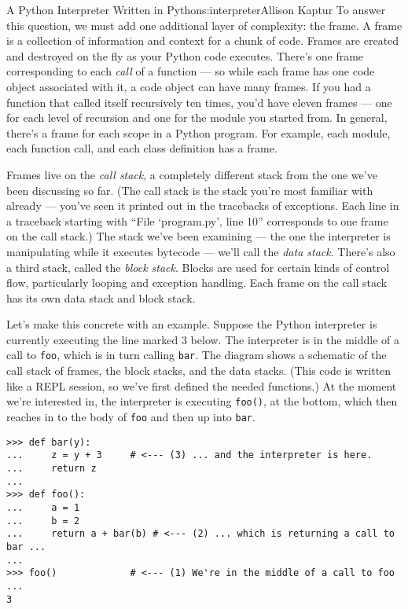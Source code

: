 \begin{aosachapter}{A Python Interpreter Written in Python}{s:interpreter}{Allison Kaptur}
To answer this question, we must add one additional layer of complexity:
the frame. A frame is a collection of information and context for a
chunk of code. Frames are created and destroyed on the fly as your
Python code executes. There's one frame corresponding to each
\emph{call} of a function --- so while each frame has one code object
associated with it, a code object can have many frames. If you had a
function that called itself recursively ten times, you'd have eleven
frames --- one for each level of recursion and one for the module you
started from. In general, there's a frame for each scope in a Python
program. For example, each module, each function call, and each class
definition has a frame.

Frames live on the \emph{call stack}, a completely different stack from
the one we've been discussing so far. (The call stack is the stack
you're most familiar with already --- you've seen it printed out in the
tracebacks of exceptions. Each line in a traceback starting with ``File
`program.py', line 10'' corresponds to one frame on the call stack.) The
stack we've been examining --- the one the interpreter is manipulating
while it executes bytecode --- we'll call the \emph{data stack}. There's
also a third stack, called the \emph{block stack}. Blocks are used for
certain kinds of control flow, particularly looping and exception
handling. Each frame on the call stack has its own data stack and block
stack.

Let's make this concrete with an example. Suppose the Python interpreter
is currently executing the line marked 3 below. The interpreter is in
the middle of a call to \texttt{foo}, which is in turn calling
\texttt{bar}. The diagram shows a schematic of the call stack of frames,
the block stacks, and the data stacks. (This code is written like a REPL
session, so we've first defined the needed functions.) At the moment
we're interested in, the interpreter is executing \texttt{foo()}, at the
bottom, which then reaches in to the body of \texttt{foo} and then up
into \texttt{bar}.

\begin{verbatim}
>>> def bar(y):
...     z = y + 3     # <--- (3) ... and the interpreter is here.
...     return z
...
>>> def foo():
...     a = 1
...     b = 2
...     return a + bar(b) # <--- (2) ... which is returning a call to bar ...
...
>>> foo()             # <--- (1) We're in the middle of a call to foo ...
3
\end{verbatim}



\end{aosachapter}
